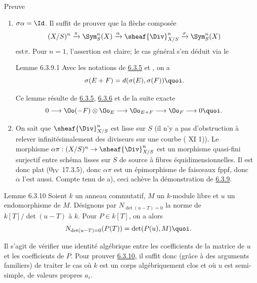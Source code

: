 \documentclass[10pt]{../fichiers-configuration-latex/smfart}
\begin{document}
\begin{enonce*}[remark]{Preuve}
\begin{enumerate}
\renewcommand{\theenumi}{\alph{enumi}}
\renewcommand{\labelenumi}{\theenumi)}
\item $\sigma\alpha=\Id$. Il suffit de prouver que la flèche composée
$$
(X/S)^{n}\xrightarrow{\pi}\Sym^{n}_{S}(X)\xrightarrow{\alpha}\sheaf{\Div}^{n}_{X/S}\xrightarrow{\sigma}\Sym^{n}_{S}(X)
$$
est\pageoriginale $\pi$. Pour $n=1$, l'assertion est claire; le cas
général s'en déduit via le

\begin{enonce*}{Lemme 6.3.9.1}
Avec les notations de \hyperref[XVII.prop6.3.5]{6.3.5} et , on a
\[
\sigma(E+F)=d(\sigma(E),\sigma(F)){\quoi}.
\]
\end{enonce*}

Ce lemme résulte de \hyperref[XVII.prop6.3.5]{6.3.5}, \hyperref[XVII.lem6.3.6]{6.3.6} et de la suite exacte
\[
0\longrightarrow \Oo(-F)\otimes \Oo_{E}\longrightarrow
\Oo_{E+F}\longrightarrow \Oo_{F}\longrightarrow 0{\quoi}.
\]

\item On sait que $\sheaf{\Div}^{n}_{X/S}$ est lisse sur $S$ (il n'y a pas
d'obstruction à relever infinitésimalement des diviseurs sur une
courbe (\cf {} XI 1)). Le morphisme
$\alpha\pi:(X/S)^{n}\rightarrow \sheaf{\Div}^{n}_{X/S}$ est un morphisme
quasi-fini surjectif entre schéma lisses sur $S$ de source à fibres
équidimensionnelles. Il est donc plat (\EGA ${\rm 0_{IV}}$ 17.3.5),
donc $\alpha\pi$ est un épimorphisme de faisceaux fppf, donc $\alpha$
l'est aussi. Compte tenu de a), ceci achève la démonstration de \hyperref[XVII.prop6.3.9]{6.3.9}.
\end{enumerate}
\end{enonce*}

\begin{enonce*}{Lemme 6.3.10}
Soient $k$ un anneau commutatif, $M$ un $k$-module libre et $u$ un
endomorphisme de $M$. Désignons par $N_{\det(u-T)=0}$ la norme de
$k[T]/\det(u-T)$ à $k$. Pour $P\in k[T]$, on a alors
\[
N_{\det(u-T)=0} (P(T))=\det(P(u),M){\quoi}.
\]
\end{enonce*}

Il s'agit de vérifier une identité algébrique entre les coefficients
de la matrice de $u$ et les coefficients de $P$. Pour prouver \hyperref[XVII.lem6.3.10]{6.3.10},
il suffit donc (grâce à des arguments familiers) de traiter le cas où
$k$ est un corps algébriquement clos et où $u$ est semi-simple, de
valeurs propres $a_{i}$.
\end{document}
